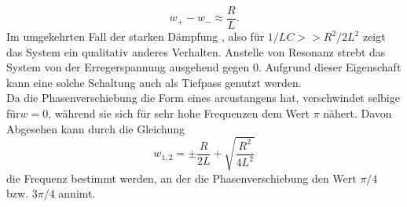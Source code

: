 \begin{equation*}
w_+-w_-\approx \frac{R}{L}.
\end{equation*}
Im umgekehrten Fall der starken Dämpfung , also für $1/LC>>R^2/2L^2$ zeigt das System ein qualitativ anderes Verhalten. Anstelle von Resonanz strebt das System von der Erregerspannung ausgehend gegen $0$. Aufgrund dieser Eigenschaft kann eine solche Schaltung auch als Tiefpass genutzt werden. \\
Da die Phasenverschiebung die Form eines arcustangens hat, verschwindet selbige für$w=0$, während sie sich für sehr hohe Frequenzen dem Wert $\pi$ nähert. Davon Abgesehen kann durch die Gleichung
\begin{equation}
w_{1,2}=\pm \frac{R}{2L}+\sqrt{\frac{R^2}{4L^2}}
\end{equation}
die Frequenz bestimmt werden, an der die Phasenverschiebung den Wert $\pi /4$ bzw. $3\pi/4$ annimt.

